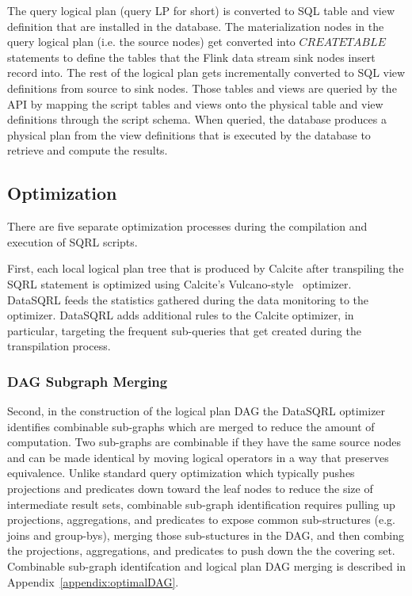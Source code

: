 \documentclass[	DIV=calc,%
							paper=letter,%
							fontsize=11pt,%
							twocolumn]{scrartcl}	 					%
\begin{document}
The query logical plan (query LP for short) is converted to SQL table and view definition that are installed in the database. The materialization nodes in the query logical plan (i.e. the source nodes) get converted into $CREATE TABLE$ statements to define the tables that the Flink data stream sink nodes insert record into. The rest of the logical plan gets incrementally converted to SQL view definitions from source to sink nodes. Those tables and views are queried by the API by mapping the script tables and views onto the physical table and view definitions through the script schema. When queried, the database produces a physical plan from the view definitions that is executed by the database to retrieve and compute the results.

\subsection{Optimization}
\label{sec:optimization}

There are five separate optimization processes during the compilation and execution of SQRL scripts.

First, each local logical plan tree that is produced by Calcite after transpiling the SQRL statement is optimized using Calcite's Vulcano-style~\cite{} optimizer. DataSQRL feeds the statistics gathered during the data monitoring to the optimizer. DataSQRL adds additional rules to the Calcite optimizer, in particular, targeting the frequent sub-queries that get created during the transpilation process.

\subsubsection{DAG Subgraph Merging}

Second, in the construction of the logical plan DAG the DataSQRL optimizer identifies combinable sub-graphs which are merged to reduce the amount of computation. Two sub-graphs are combinable if they have the same source nodes and can be made identical by moving logical operators in a way that preserves equivalence. Unlike standard query optimization which typically pushes projections and predicates down toward the leaf nodes to reduce the size of intermediate result sets, combinable sub-graph identification requires pulling up projections, aggregations, and predicates to expose common sub-structures (e.g. joins and group-bys), merging those sub-stuctures in the DAG, and then combing the projections, aggregations, and predicates to push down the the covering set. Combinable sub-graph identifcation and logical plan DAG merging is described in Appendix~\ref{appendix:optimalDAG}.
\end{document}

